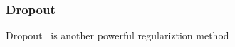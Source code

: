 \subsubsection{Dropout}

Dropout~\cite{JMLR:v15:srivastava14a} is another powerful regulariztion method 